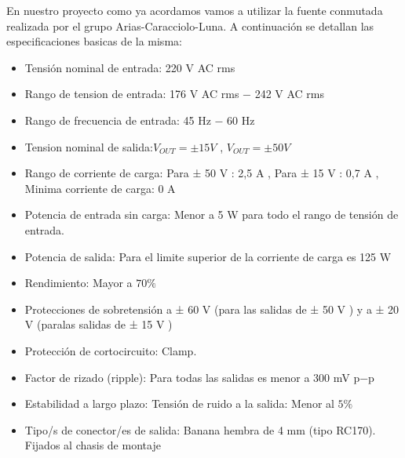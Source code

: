 \documentclass[a4paper,12pt,twoside]{article}
\begin{document}
En nuestro proyecto como ya acordamos vamos a utilizar la fuente conmutada realizada por el grupo Arias-Caracciolo-Luna.
A continuación se detallan las especificaciones basicas de la misma:

\begin{itemize}
\item{Tensión nominal de entrada: 220 V AC rms}
\item{Rango de tension de entrada: 176 V AC rms − 242 V AC rms}
\item{Rango de frecuencia de entrada: 45 Hz − 60 Hz}
\item{Tension nominal de salida:$ V_{OUT} = ± 15 V$ , $V_{OUT} = ± 50 V$}
\item{Rango de corriente de carga: Para ± 50 V : 2,5 A , Para ± 15 V : 0,7 A , Minima corriente de carga: 0 A}
\item{Potencia de entrada sin carga: Menor a 5 W para todo el rango de tensión de entrada.}
\item{Potencia de salida: Para el limite superior de la corriente de carga es 125 W}
\item{Rendimiento: Mayor a $70\%$}
\item{Protecciones de sobretensión a ± 60 V (para las salidas de ± 50 V ) y a ± 20 V (paralas salidas de ± 15 V )}
\item{Protección de cortocircuito: Clamp.}
\item{Factor de rizado (ripple): Para todas las salidas es menor a 300 mV p−p}
\item{Estabilidad a largo plazo: Tensión de ruido a la salida: Menor al $5\%$}
\item{Tipo/s de conector/es de salida: Banana hembra de 4 mm  (tipo RC170). Fijados al chasis de montaje}
\end{itemize}









\end{document}
